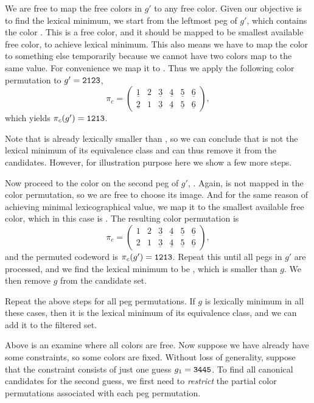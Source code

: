 We are free to map the free colors in $g'$ to any free color. Given our objective is to find the lexical minimum, we start from the leftmost peg of $g'$, which contains the color . This is a free color, and it should be mapped to be smallest available free color,  to achieve lexical minimum. This also means we have to map the color  to something else temporarily because we cannot have two colors map to the same value. For convenience we map it to . Thus we apply the following color permutation to $g' = \texttt{2123}$,
\[
\pi_c = 
\begin{pmatrix}
\underline{1} & 2 & \underline{3} & \underline{4} & \underline{5} & \underline{6} \\
\underline{2} & 1 & \underline{3} & \underline{4} & \underline{5} & \underline{6} 
\end{pmatrix} ,
\]
which yields $\pi_c(g') = \texttt{1213}$.

Note that  is already lexically smaller than , so we can conclude that  is not the lexical minimum of its equivalence class and can thus remove it from the candidates. However, for illustration purpose here we show a few more steps.

Now proceed to the color on the second peg of $g'$, . Again,  is not mapped in the color permutation, so we are free to choose its image. And for the same reason of achieving minimal lexicographical value, we map it to the smallest available free color, which in this case is . The resulting color permutation is
\[
\pi_c = 
\begin{pmatrix}
1 & 2 & \underline{3} & \underline{4} & \underline{5} & \underline{6} \\
2 & 1 & \underline{3} & \underline{4} & \underline{5} & \underline{6} 
\end{pmatrix} ,
\]
and the permuted codeword is $\pi_c(g') = \texttt{1213}$. Repeat this until all pegs in $g'$ are processed, and we find the lexical minimum to be , which is smaller than $g$. We then remove $g$ from the candidate set. 

Repeat the above steps for all peg permutations. If $g$ is lexically minimum in all these cases, then it is the lexical minimum of its equivalence class, and we can add it to the filtered set.

Above is an examine where all colors are free. Now suppose we have already have some constraints, so some colors are fixed. Without loss of generality, suppose that the constraint consists of just one guess $g_1 = \texttt{3445}$. To find all canonical candidates for the second guess, we first need to \emph{restrict} the partial color permutations associated with each peg permutation. 

